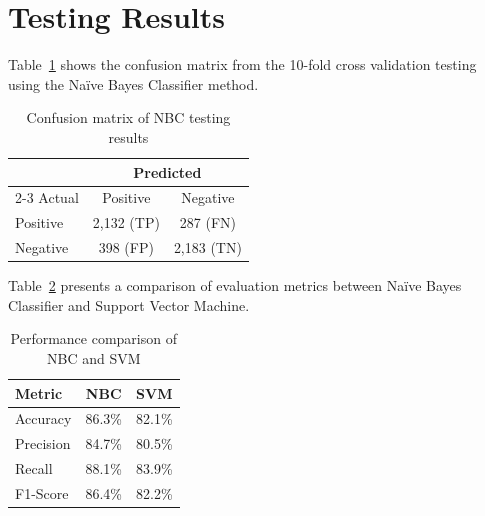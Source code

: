 \section{Testing Results}

Table~\ref{tab:confusion} shows the confusion matrix from the 10-fold cross validation testing using the Na\"ive Bayes Classifier method.

\begin{table}[H]
\centering
\caption{Confusion matrix of NBC testing results}
\label{tab:confusion}
\begin{tabular}{@{}lcc@{}}
\toprule
 & \multicolumn{2}{c}{Predicted} \\
\cmidrule{2-3}
Actual & Positive & Negative \\
\midrule
Positive & 2,132 (TP) & 287 (FN) \\
Negative & 398 (FP) & 2,183 (TN) \\
\bottomrule
\end{tabular}
\end{table}

Table~\ref{tab:comparison} presents a comparison of evaluation metrics between Na\"ive Bayes Classifier and Support Vector Machine.

\begin{table}[H]
\centering
\caption{Performance comparison of NBC and SVM}
\label{tab:comparison}
\begin{tabular}{@{}lcc@{}}
\toprule
Metric & NBC & SVM \\
\midrule
Accuracy & 86.3\% & 82.1\% \\
Precision & 84.7\% & 80.5\% \\
Recall & 88.1\% & 83.9\% \\
F1-Score & 86.4\% & 82.2\% \\
\bottomrule
\end{tabular}
\end{table}
